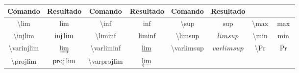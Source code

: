 % 
% 
% 
% 
% 
\begin{tabular}{cc|cc|cc|cc}
    \hline
    Comando & Resultado & Comando & Resultado & Comando & Resultado \\ \hline
    \textbackslash\textsf{lim} & $\lim$ & \textbackslash\textsf{inf} & $\inf$ & \textbackslash\textsf{sup} & $\sup$ & \textbackslash\textsf{max} & $\max$ \\
    \textbackslash\textsf{injlim} & $\injlim$ & \textbackslash\textsf{liminf} & $\liminf$ & \textbackslash\textsf{limsup} & $limsup$ & \textbackslash\textsf{min} & $\min$ \\
    \textbackslash\textsf{varinjlim} & $\varinjlim$ & \textbackslash\textsf{varliminf} & $\varliminf$ & \textbackslash\textsf{varlimsup} & $varlimsup$ & \textbackslash\textsf{Pr} & $\Pr$ \\
    \textbackslash\textsf{projlim} & $\projlim$ & \textbackslash\textsf{varprojlim} & $\varprojlim$ & \\ \hline
\end{tabular}
